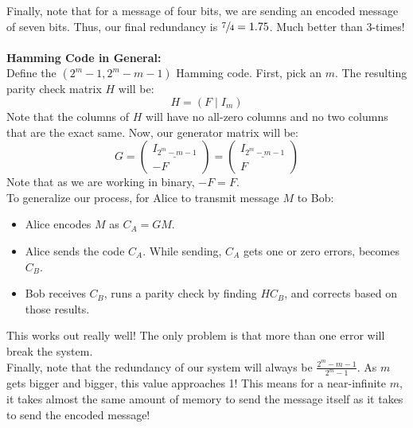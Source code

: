 \documentclass[12pt]{amsart}
\begin{document}
Finally, note that for a message of four bits, we are sending an encoded message of seven bits. Thus, our final redundancy is $\sfrac{7}{4}=1.75$. Much better than 3-times!
\\
\\
\textbf{Hamming Code in General:}\\
Define the $(2^m-1, 2^m-m-1)$ Hamming code. First, pick an $m$. The resulting parity check matrix $H$ will be:
\[H = (F \mid I_m)\]
Note that the columns of $H$ will have no all-zero columns and no two columns that are the exact same. Now, our generator matrix will be:
\[G = \begin{pmatrix}\underline{I_{2^m-m-1}} \\ -F\end{pmatrix} = \begin{pmatrix}\underline{I_{2^m-m-1}}\\F\end{pmatrix}\]
Note that as we are working in binary, $-F=F$.\\
To generalize our process, for Alice to transmit message $M$ to Bob:
\begin{itemize}
	\item Alice encodes $M$ as $C_A=GM$.
	\item Alice sends the code $C_A$. While sending, $C_A$ gets one or zero errors, becomes $C_B$.
	\item Bob receives $C_B$, runs a parity check by finding $HC_B$, and corrects based on those results.
\end{itemize}
This works out really well! The only problem is that more than one error will break the system.\\
Finally, note that the redundancy of our system will always be $\frac{2^m-m-1}{2^m-1}$. As $m$ gets bigger and bigger, this value approaches 1! This means for a near-infinite $m$, it takes almost the same amount of memory to send the message itself as it takes to send the encoded message!
\end{document}

